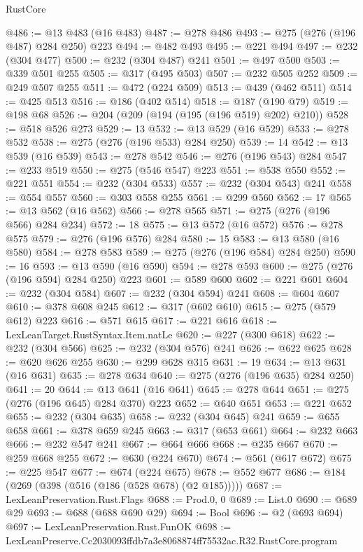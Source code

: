 \begin{lexlean}{RustCore}
\begin{coremodule}
@486 := @13 @483 (@16 @483)
@487 := @278 @486
@493 := @275 (@276 (@196 @487) @284 @250) @223
@494 := @482 @493
@495 := @221 @494
@497 := @232 (@304 @477)
@500 := @232 (@304 @487) @241
@501 := @497 @500
@503 := @339 @501 @255
@505 := @317 (@495 @503)
@507 := @232 @505 @252
@509 := @249 @507 @255
@511 := @472 (@224 @509)
@513 := @439 (@462 @511)
@514 := @425 @513
@516 := @186 (@402 @514)
@518 := @187 (@190 @79)
@519 := @198 @68
@526 := @204 (@209 (@194 (@195 (@196 @519) @202) @210))
@528 := @518 @526 @273
@529 := 13
@532 := @13 @529 (@16 @529)
@533 := @278 @532
@538 := @275 (@276 (@196 @533) @284 @250)
@539 := 14
@542 := @13 @539 (@16 @539)
@543 := @278 @542
@546 := @276 (@196 @543) @284
@547 := @233 @519
@550 := @275 (@546 @547) @223
@551 := @538 @550
@552 := @221 @551
@554 := @232 (@304 @533)
@557 := @232 (@304 @543) @241
@558 := @554 @557
@560 := @303 @558 @255
@561 := @299 @560
@562 := 17
@565 := @13 @562 (@16 @562)
@566 := @278 @565
@571 := @275 (@276 (@196 @566) @284 @234)
@572 := 18
@575 := @13 @572 (@16 @572)
@576 := @278 @575
@579 := @276 (@196 @576) @284
@580 := 15
@583 := @13 @580 (@16 @580)
@584 := @278 @583
@589 := @275 (@276 (@196 @584) @284 @250)
@590 := 16
@593 := @13 @590 (@16 @590)
@594 := @278 @593
@600 := @275 (@276 (@196 @594) @284 @250) @223
@601 := @589 @600
@602 := @221 @601
@604 := @232 (@304 @584)
@607 := @232 (@304 @594) @241
@608 := @604 @607
@610 := @378 @608 @245
@612 := @317 (@602 @610)
@615 := @275 (@579 @612) @223
@616 := @571 @615
@617 := @221 @616
@618 := LexLeanTarget.RustSyntax.Item.natLe
@620 := @227 (@300 @618)
@622 := @232 (@304 @566)
@625 := @232 (@304 @576) @241
@626 := @622 @625
@628 := @620 @626 @255
@630 := @299 @628 @315
@631 := 19
@634 := @13 @631 (@16 @631)
@635 := @278 @634
@640 := @275 (@276 (@196 @635) @284 @250)
@641 := 20
@644 := @13 @641 (@16 @641)
@645 := @278 @644
@651 := @275 (@276 (@196 @645) @284 @370) @223
@652 := @640 @651
@653 := @221 @652
@655 := @232 (@304 @635)
@658 := @232 (@304 @645) @241
@659 := @655 @658
@661 := @378 @659 @245
@663 := @317 (@653 @661)
@664 := @232 @663
@666 := @232 @547 @241
@667 := @664 @666
@668 := @235 @667
@670 := @259 @668 @255
@672 := @630 (@224 @670)
@674 := @561 (@617 @672)
@675 := @225 @547
@677 := @674 (@224 @675)
@678 := @552 @677
@686 := @184 (@269 (@398 (@516 (@186 (@528 @678) (@2 @185)))))
@687 := LexLeanPreservation.Rust.Flags
@688 := Prod.{0, 0}
@689 := List.{0}
@690 := @689 @29
@693 := @688 (@688 @690 @29)
@694 := Bool
@696 := @2 (@693 @694)
@697 := LexLeanPreservation.Rust.FunOK
@698 := LexLeanPreserve.Cc2030093ffdb7a3e8068874ff75532ac.R32.RustCore.program

\end{coremodule}
\end{lexlean}
